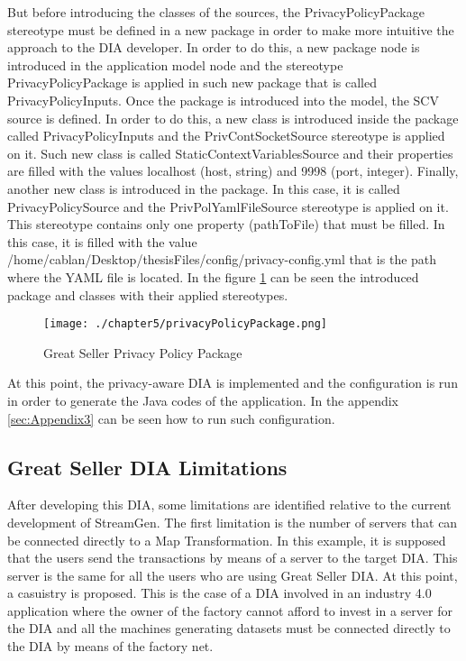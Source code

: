 But before introducing the classes of the sources, the PrivacyPolicyPackage stereotype must be defined in a new package in order to make more intuitive the approach to the DIA developer. In order to do this, a new package node is introduced in the application model node and the stereotype PrivacyPolicyPackage is applied in such new package that is called PrivacyPolicyInputs. Once the package is introduced into the model, the SCV source is defined. In order to do this, a new class is introduced inside the package called PrivacyPolicyInputs and the PrivContSocketSource stereotype is applied on it. Such new class is called StaticContextVariablesSource and their properties are filled with the values localhost (host, string) and 9998 (port, integer). Finally, another new class is introduced in the package. In this case, it is called PrivacyPolicySource and the PrivPolYamlFileSource stereotype is applied on it. This stereotype contains only one property (pathToFile) that must be filled. In this case, it is filled with the value /home/cablan/Desktop/thesisFiles/config/privacy-config.yml that is the path where the YAML file is located. In the figure \ref{fig:Great Seller Privacy Policy Package} can be seen the introduced package and classes with their applied stereotypes.

\begin{figure}
\centering
{\texttt{[image: ./chapter5/privacyPolicyPackage.png]}}
\caption{Great Seller Privacy Policy Package}
\label{fig:Great Seller Privacy Policy Package}
\end{figure}

At this point, the privacy-aware DIA is implemented and the configuration is run in order to generate the Java codes of the application. In the appendix \ref{sec:Appendix3} can be seen how to run such configuration.

\subsection{Great Seller DIA Limitations}

After developing this DIA, some limitations are identified relative to the current development of StreamGen. The first limitation is the number of servers that can be connected directly to a Map Transformation. In this example, it is supposed that the users send the transactions by means of a server to the target DIA. This server is the same for all the users who are using Great Seller DIA. At this point, a casuistry is proposed. This is the case of a DIA involved in an industry 4.0 application where the owner of the factory cannot afford to invest in a server for the DIA and all the machines generating datasets must be connected directly to the DIA by means of the factory net.

